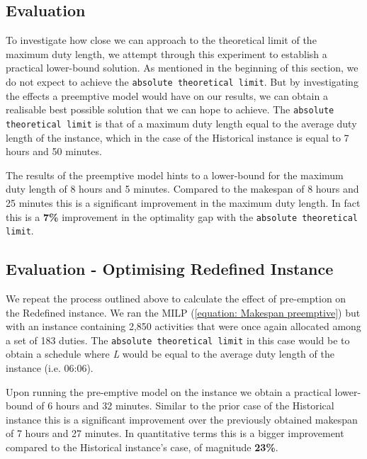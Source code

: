 
\subsection*{Evaluation}
To investigate how close we can approach to the theoretical limit of the maximum duty length, we attempt through this experiment to establish a practical lower-bound solution. As mentioned in the beginning of this section, we do not expect to achieve the \texttt{absolute theoretical limit}. But by investigating the effects a preemptive model would have on our results, we can obtain a realisable best possible solution that we can hope to achieve. The \texttt{absolute theoretical limit} is that of a maximum duty length equal to the average duty length of the instance, which in the case of the Historical instance is equal to 7 hours and 50 minutes.

\vspace{\baselineskip}
\noindent
The results of the preemptive model hints to a lower-bound for the maximum duty length of 8 hours and 5 minutes. Compared to the makespan of 8 hours and 25 minutes this is a significant improvement in the maximum duty length. In fact this is a \textbf{7\%} improvement in the optimality gap with the \texttt{absolute theoretical limit}. 


\subsection*{Evaluation - Optimising Redefined Instance}
We repeat the process outlined above to calculate the effect of pre-emption on the Redefined instance. We ran the MILP (\ref{equation: Makespan preemptive}) but with an instance containing 2,850 activities that were once again allocated among a set of 183 duties. The \texttt{absolute theoretical limit} in this case would be to obtain a schedule where \textit{L} would be equal to the average duty length of the instance (i.e. 06:06). 

\vspace{\baselineskip}
\noindent
Upon running the pre-emptive model on the instance we obtain a practical lower-bound of 6 hours and 32 minutes. Similar to the prior case of the Historical instance this is a significant improvement over the previously obtained makespan of 7 hours and 27 minutes. In quantitative terms this is a bigger improvement compared to the Historical instance's case, of magnitude \textbf{23\%}.